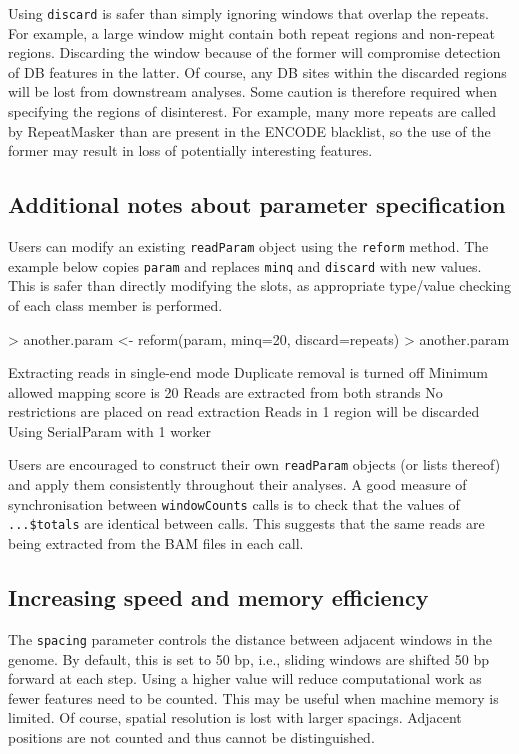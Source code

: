 \documentclass[12pt]{report}
\renewenvironment{Schunk}{\vspace{0pt}}{\vspace{0pt}}
\newcommand{\code}[1]{{\small\texttt{#1}}}
\begin{document}
Using \code{discard} is safer than simply ignoring windows that overlap the repeats. 
For example, a large window might contain both repeat regions and non-repeat regions. 
Discarding the window because of the former will compromise detection of DB features in the latter. 
Of course, any DB sites within the discarded regions will be lost from downstream analyses.  
Some caution is therefore required when specifying the regions of disinterest.
For example, many more repeats are called by RepeatMasker than are present in the ENCODE blacklist, so the use of the former may result in loss of potentially interesting features.

\subsection{Additional notes about parameter specification}
Users can modify an existing \code{readParam} object using the \code{reform} method.
The example below copies \code{param} and replaces \code{minq} and \code{discard} with new values.
This is safer than directly modifying the slots, as appropriate type/value checking of each class member is performed.

\begin{Schunk}
\begin{Sinput}
> another.param <- reform(param, minq=20, discard=repeats)
> another.param
\end{Sinput}
\begin{Soutput}
    Extracting reads in single-end mode
    Duplicate removal is turned off 
    Minimum allowed mapping score is 20 
    Reads are extracted from both strands
    No restrictions are placed on read extraction
    Reads in 1 region will be discarded
    Using SerialParam with 1 worker
\end{Soutput}
\end{Schunk}

Users are encouraged to construct their own \code{readParam} objects (or lists thereof) and apply them consistently throughout their analyses.
A good measure of synchronisation between \code{windowCounts} calls is to check that the values of \code{...\$totals} are identical between calls. 
This suggests that the same reads are being extracted from the BAM files in each call. 

\subsection{Increasing speed and memory efficiency}
\label{sec:efficiency}
The \code{spacing} parameter controls the distance between adjacent windows in the genome.
By default, this is set to 50 bp, i.e., sliding windows are shifted 50 bp forward at each step.
Using a higher value will reduce computational work as fewer features need to be counted.
This may be useful when machine memory is limited. 
Of course, spatial resolution is lost with larger spacings.
Adjacent positions are not counted and thus cannot be distinguished. 
\end{document}
